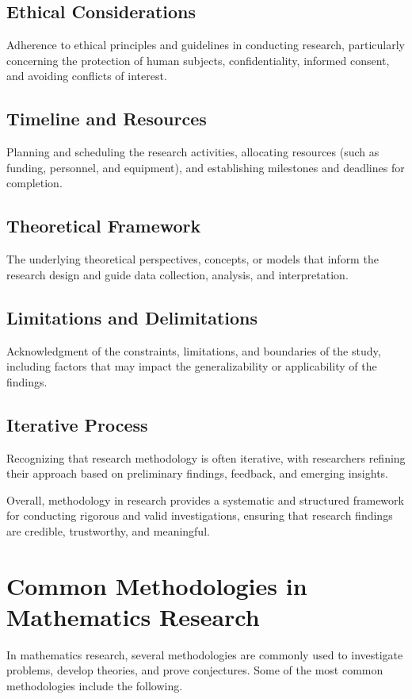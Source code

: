 \subsection{Ethical Considerations}
Adherence to ethical principles and guidelines in conducting research, particularly concerning the protection of human subjects, confidentiality, informed consent, and avoiding conflicts of interest.
    
\subsection{Timeline and Resources}
Planning and scheduling the research activities, allocating resources (such as funding, personnel, and equipment), and establishing milestones and deadlines for completion.
    
\subsection{Theoretical Framework}
The underlying theoretical perspectives, concepts, or models that inform the research design and guide data collection, analysis, and interpretation.
    
\subsection{Limitations and Delimitations}
Acknowledgment of the constraints, limitations, and boundaries of the study, including factors that may impact the generalizability or applicability of the findings.
    
\subsection{Iterative Process}
Recognizing that research methodology is often iterative, with researchers refining their approach based on preliminary findings, feedback, and emerging insights.


Overall, methodology in research provides a systematic and structured framework for conducting rigorous and valid investigations, ensuring that research findings are credible, trustworthy, and meaningful.


\section{Common Methodologies in Mathematics Research}
In mathematics research, several methodologies are commonly used to investigate problems, develop theories, and prove conjectures.
Some of the most common methodologies include the following.

